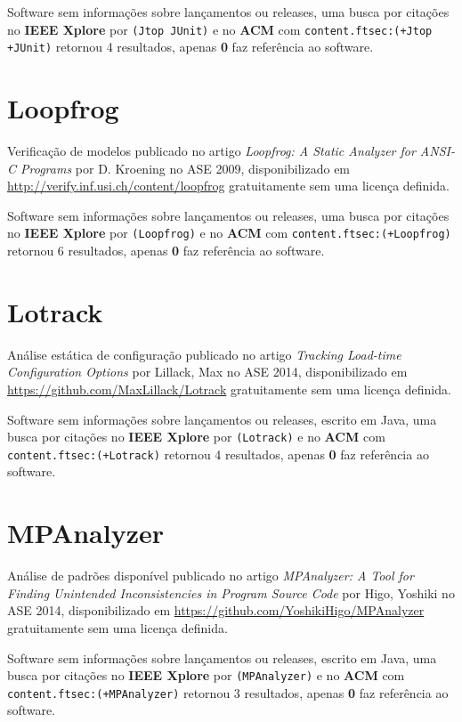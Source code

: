 Software sem informações sobre lançamentos ou releases,
uma busca por citações no {\bf IEEE Xplore} por
\texttt{(Jtop JUnit)}
e no {\bf ACM} com
\texttt{content.ftsec:(+Jtop +JUnit)}
retornou
4 resultados, apenas
{\bf 0} faz referência ao software.



\section{Loopfrog}

Verificação de modelos
publicado no artigo {\it Loopfrog: A Static Analyzer for ANSI-C Programs}
por D. Kroening
no ASE 2009,
disponibilizado em \url{http://verify.inf.usi.ch/content/loopfrog}
gratuitamente
sem uma licença definida.

Software sem informações sobre lançamentos ou releases,
uma busca por citações no {\bf IEEE Xplore} por
\texttt{(Loopfrog)}
e no {\bf ACM} com
\texttt{content.ftsec:(+Loopfrog)}
retornou
6 resultados, apenas
{\bf 0} faz referência ao software.



\section{Lotrack}

Análise estática de configuração
publicado no artigo {\it Tracking Load-time Configuration Options}
por Lillack, Max
no ASE 2014,
disponibilizado em \url{https://github.com/MaxLillack/Lotrack}
gratuitamente
sem uma licença definida.

Software sem informações sobre lançamentos ou releases,
escrito em Java,
uma busca por citações no {\bf IEEE Xplore} por
\texttt{(Lotrack)}
e no {\bf ACM} com
\texttt{content.ftsec:(+Lotrack)}
retornou
4 resultados, apenas
{\bf 0} faz referência ao software.



\section{MPAnalyzer}

Análise de padrões disponível
publicado no artigo {\it MPAnalyzer: A Tool for Finding Unintended Inconsistencies in Program Source Code}
por Higo, Yoshiki
no ASE 2014,
disponibilizado em \url{https://github.com/YoshikiHigo/MPAnalyzer}
gratuitamente
sem uma licença definida.

Software sem informações sobre lançamentos ou releases,
escrito em Java,
uma busca por citações no {\bf IEEE Xplore} por
\texttt{(MPAnalyzer)}
e no {\bf ACM} com
\texttt{content.ftsec:(+MPAnalyzer)}
retornou
3 resultados, apenas
{\bf 0} faz referência ao software.



